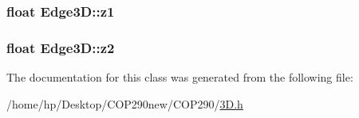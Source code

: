 \subsubsection[{\texorpdfstring{z1}{z1}}]{\setlength{\rightskip}{0pt plus 5cm}float Edge3\+D\+::z1}\hypertarget{class_edge3_d_a436d6f44e6fafe5a9e6dd571b91b89a3}{}\label{class_edge3_d_a436d6f44e6fafe5a9e6dd571b91b89a3}
\subsubsection[{\texorpdfstring{z2}{z2}}]{\setlength{\rightskip}{0pt plus 5cm}float Edge3\+D\+::z2}\hypertarget{class_edge3_d_a1e311241800a66f37b5e5a501da05e15}{}\label{class_edge3_d_a1e311241800a66f37b5e5a501da05e15}


The documentation for this class was generated from the following file\+:\begin{DoxyCompactItemize}
\item 
/home/hp/\+Desktop/\+C\+O\+P290new/\+C\+O\+P290/\hyperlink{3_d_8h}{3\+D.\+h}\end{DoxyCompactItemize}
